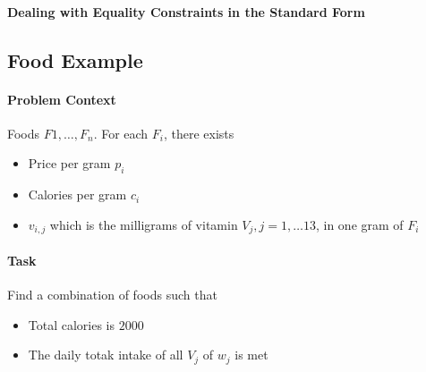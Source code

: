 \paragraph{Dealing with Equality Constraints in the Standard Form}


\subsection{Food Example}
\paragraph{Problem Context}
Foods \(F1, \ldots, F_n\). For each \(F_i\), there exists
 \begin{itemize}
   \item Price per gram \(p_i\) 
   \item Calories per gram \(c_i\)
   \item \(v_{i, j}\) which is the milligrams of vitamin
     \(V_j, j = 1, \ldots 13\), in one gram of \(F_i\) 
\end{itemize}

\paragraph{Task}
Find a combination of foods such that
\begin{itemize}
  \item Total calories is \(2000\)
  \item The daily totak intake of all \(V_j\) of  \(w_j\) is met
\end{itemize}



